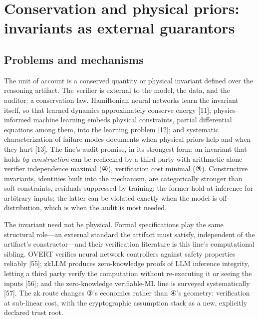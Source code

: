 \documentclass[11pt]{article}
\begin{document}
\section{Conservation and physical priors: invariants as external guarantors}
\label{sec:8}
\subsection{Problems and mechanisms}
\noindent The unit of account is a conserved quantity or physical invariant defined over the reasoning artifact. The verifier is external to the model, the data, and the auditor: a conservation law. Hamiltonian neural networks learn the invariant itself, so that learned dynamics approximately conserve energy [11]; physics-informed machine learning embeds physical constraints, partial differential equations among them, into the learning problem [12]; and systematic characterization of failure modes documents when physical priors help and when they hurt [13]. The line's audit promise, in its strongest form: an invariant that holds \emph{by construction} can be rechecked by a third party with arithmetic alone—verifier independence maximal (④), verification cost minimal (③). Constructive invariants, identities built into the mechanism, are categorically stronger than soft constraints, residuals suppressed by training: the former hold at inference for arbitrary inputs; the latter can be violated exactly when the model is off-distribution, which is when the audit is most needed.\par
\noindent The invariant need not be physical. Formal specifications play the same structural role—an external standard the artifact must satisfy, independent of the artifact's constructor—and their verification literature is this line's computational sibling. OVERT verifies neural network controllers against safety properties reliably [55]; zkLLM produces zero-knowledge proofs of LLM inference integrity, letting a third party verify the computation without re-executing it or seeing the inputs [56]; and the zero-knowledge verifiable-ML line is surveyed systematically [57]. The zk route changes ③'s economics rather than ④'s geometry: verification at sub-linear cost, with the cryptographic assumption stack as a new, explicitly declared trust root.\par
\end{document}
